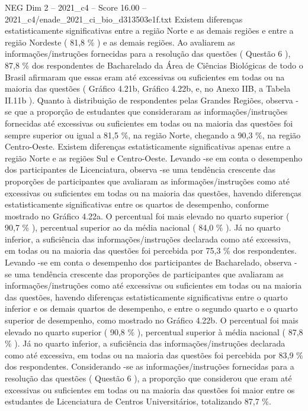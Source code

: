 \begin{textsample}{NEG Dim 2 – 2021\_c4 – Score 16.00 – 2021\_c4/enade\_2021\_ci\_bio\_d313503e1f.txt}
Existem diferenças estatisticamente significativas entre a região Norte e as demais regiões e entre a região Nordeste ( 81,8 \% ) e as demais regiões.
Ao avaliarem as informações/instruções fornecidas para a resolução das questões ( Questão 6 ), 87,8 \% dos respondentes de Bacharelado da Área de Ciências Biológicas de todo o Brasil afirmaram que essas eram até excessivas ou suficientes em todas ou na maioria das questões ( Gráfico 4.21b, Gráfico 4.22b, e, no Anexo IIB, a Tabela II.11b ).
Quanto à distribuição de respondentes pelas Grandes Regiões, observa -se que a proporção de estudantes que consideraram as informações/instruções fornecidas até excessivas ou suficientes em todas ou na maioria das questões foi sempre superior ou igual a 81,5 \%, na região Norte, chegando a 90,3 \%, na região Centro-Oeste.
Existem diferenças estatisticamente significativas apenas entre a região Norte e as regiões Sul e Centro-Oeste.
Levando -se em conta o desempenho dos participantes de Licenciatura, observa -se uma tendência crescente das proporções de participantes que avaliaram as informações/instruções como até excessivas ou suficientes em todas ou na maioria das questões, havendo diferenças estatisticamente significativas entre os quartos de desempenho, conforme mostrado no Gráfico 4.22a.
O percentual foi mais elevado no quarto superior ( 90,7 \% ), percentual superior ao da média nacional ( 84,0 \% ).
Já no quarto inferior, a suficiência das informações/instruções declarada como até excessiva, em todas ou na maioria das questões foi percebida por 75,3 \% dos respondentes.
Levando -se em conta o desempenho dos participantes de Bacharelado, observa -se uma tendência crescente das proporções de participantes que avaliaram as informações/instruções como até excessivas ou suficientes em todas ou na maioria das questões, havendo diferenças estatisticamente significativas entre o quarto inferior e os demais quartos de desempenho, e entre o segundo quarto e o quarto superior de desempenho, como mostrado no Gráfico 4.22b.
O percentual foi mais elevado no quarto superior ( 90,8 \% ), percentual superior à média nacional ( 87,8 \% ).
Já no quarto inferior, a suficiência das informações/instruções declarada como até excessiva, em todas ou na maioria das questões foi percebida por 83,9 \% dos respondentes.
Considerando -se as informações/instruções fornecidas para a resolução das questões ( Questão 6 ), a proporção que considerou que eram até excessivas ou suficientes em todas ou na maioria das questões foi maior entre os estudantes de Licenciatura de Centros Universitários, totalizando 87,7 \%.

\end{textsample}
